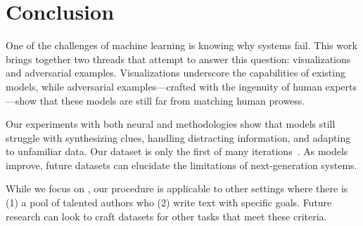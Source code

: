 \section{Conclusion}
\label{sec:future}

One of the challenges of machine learning is knowing
why systems fail.  This work brings together two threads that
attempt to answer this question: visualizations and adversarial
examples.  Visualizations underscore the capabilities of existing models,
while adversarial examples---crafted with the ingenuity of human
experts---show that these models are still
far from matching human prowess. 

Our experiments with both neural and  methodologies show that  models
still struggle with synthesizing clues, handling distracting information,
and adapting to unfamiliar data.  Our \challenge{} dataset is only the first of
many iterations~\cite{ruef16build}. As models improve, future \challenge{}
datasets can elucidate the limitations of next-generation  systems.

While we focus on , our procedure is applicable to
other  settings where there is (1) a pool of talented authors
who (2) write text with specific goals. Future research
can look to craft \challenge{} datasets for other  tasks
that meet these criteria.